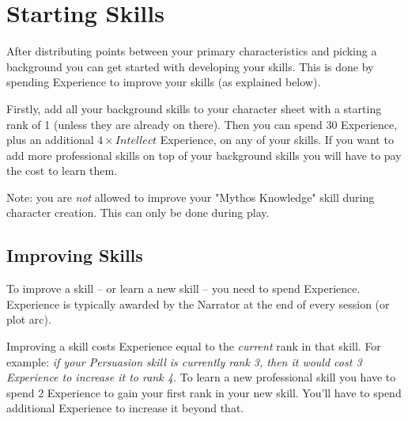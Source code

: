 \section{Starting Skills}
After distributing points between your primary characteristics and picking a background
you can get started with developing your skills. This is done by spending Experience to improve your skills (as explained below). 

Firstly, add all your background skills to your character sheet with a starting rank of 1 (unless they are already on there). 
Then you can spend 30 Experience, plus an additional $4 \times Intellect$ Experience, on any of your skills.
If you want to add more professional skills on top of your background skills
you will have to pay the cost to learn them.

Note: you are \textit{not} allowed to improve your "Mythos Knowledge" skill during character creation.
This can only be done during play. 

\subsection{Improving Skills}
To improve a skill -- or learn a new skill -- you need to spend Experience.
Experience is typically awarded by the Narrator at the end of every session (or plot arc).

Improving a skill costs Experience equal to the \textit{current} rank in that skill.
For example: \textit{if your Persuasion skill is currently rank 3, then it would cost 3 Experience to increase it to rank 4.}
To learn a new professional skill you have to spend 2 Experience to gain your first rank in your new skill.
You'll have to spend additional Experience to increase it beyond that.






